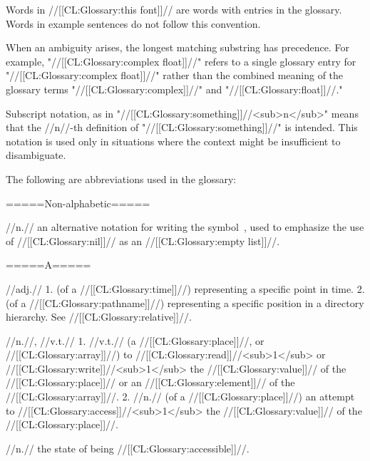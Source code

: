 Words in //[[CL:Glossary:this font]]// are words with entries in the glossary.
Words in example sentences do not follow this convention.
 
When an ambiguity arises, the longest matching substring has precedence.
For example, "//[[CL:Glossary:complex float]]//" refers to a single glossary entry 
for "//[[CL:Glossary:complex float]]//" rather than the combined meaning of the 
glossary terms "//[[CL:Glossary:complex]]//" and "//[[CL:Glossary:float]]//."

Subscript notation, as in "//[[CL:Glossary:something]]//<sub>n</sub>" means that
the //n//-th definition of "//[[CL:Glossary:something]]//" is intended. This
notation is used only in situations where the context might be insufficient
to disambiguate.

The following are abbreviations used in the glossary:

 
\beginlist

=====Non-alphabetic=====

\gentry{()} //n.// an alternative notation for writing the symbol~\nil, used to emphasize the use of //[[CL:Glossary:nil]]// as an //[[CL:Glossary:empty list]]//.

=====A=====

 //adj.// 1. (of a //[[CL:Glossary:time]]//) representing a specific point in time. 2. (of a //[[CL:Glossary:pathname]]//) representing a specific position in a directory hierarchy. See //[[CL:Glossary:relative]]//.

 //n.//, //v.t.// 1. //v.t.// (a //[[CL:Glossary:place]]//, or //[[CL:Glossary:array]]//) to //[[CL:Glossary:read]]//<sub>1</sub> or //[[CL:Glossary:write]]//<sub>1</sub> the //[[CL:Glossary:value]]// of the //[[CL:Glossary:place]]// or an //[[CL:Glossary:element]]// of the //[[CL:Glossary:array]]//. 2. //n.// (of a //[[CL:Glossary:place]]//) an attempt to //[[CL:Glossary:access]]//<sub>1</sub> the //[[CL:Glossary:value]]// of the //[[CL:Glossary:place]]//.

 //n.// the state of being //[[CL:Glossary:accessible]]//.

